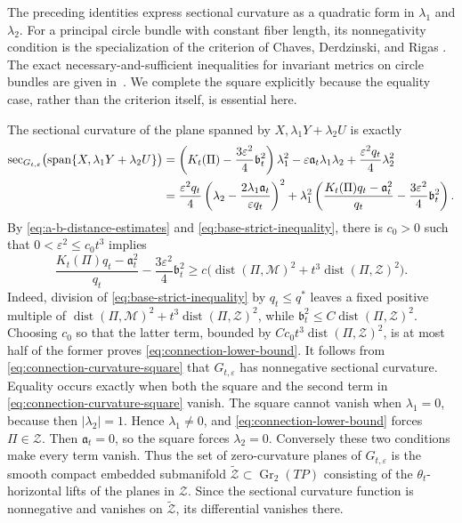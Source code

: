 \documentclass[11pt]{article}
\theoremstyle{definition}
\theoremstyle{remark}
\newcommand{\cM}{\mathcal M}
\newcommand{\cZ}{\mathcal Z}
\newcommand{\tZ}{\widetilde{\mathcal Z}}
\newcommand{\Gr}{\operatorname{Gr}}
\newcommand{\Span}{\operatorname{span}}
\newcommand{\dist}{\operatorname{dist}}
\newcommand{\eps}{\varepsilon}
\begin{document}
The preceding identities express sectional curvature as a quadratic form in
$\lambda_1$ and $\lambda_2$.  For a principal circle bundle with constant
fiber length, its nonnegativity condition is the specialization of the
criterion of Chaves, Derdzinski, and Rigas
\cite[main theorem, condition~(ii)]{ChavesDerdzinskiRigas1992}.  The exact
necessary-and-sufficient inequalities for invariant metrics on circle bundles are
given in~\cite[Lemma~3.2]{ShankarTappTuschmann2005}.  We complete the square
explicitly because the equality case, rather than the criterion itself, is
essential here.

The sectional curvature of the plane spanned by
$X,\lambda_1Y+\lambda_2U$ is exactly
\begin{align}
 \sec_{G_{t,\eps}}\bigl(\Span\{X,\lambda_1Y+\lambda_2U\}\bigr)
 &=\left(K_t(\Pi)-\frac{3\eps^2}{4}\mathfrak b_t^2\right)\lambda_1^2
   -\eps\mathfrak a_t\lambda_1\lambda_2+\frac{\eps^2q_t}{4}\lambda_2^2 \notag\\
 &=\frac{\eps^2q_t}{4}\left(\lambda_2-\frac{2\lambda_1\mathfrak a_t}{\eps q_t}\right)^2
   +\lambda_1^2\left(\frac{K_t(\Pi)q_t-\mathfrak a_t^2}{q_t}
   -\frac{3\eps^2}{4}\mathfrak b_t^2\right).                       \label{eq:connection-curvature-square}
\end{align}
By \eqref{eq:a-b-distance-estimates} and
\eqref{eq:base-strict-inequality}, there is $c_0>0$ such that
$0<\eps^2\leq c_0t^3$ implies
\begin{equation}                                                                    \label{eq:connection-lower-bound}
 \frac{K_t(\Pi)q_t-\mathfrak a_t^2}{q_t}
 -\frac{3\eps^2}{4}\mathfrak b_t^2
 \geq c\bigl(\dist(\Pi,\cM)^2+t^3\dist(\Pi,\cZ)^2\bigr).
\end{equation}
Indeed, division of \eqref{eq:base-strict-inequality} by $q_t\leq q^*$ leaves
a fixed positive multiple of
$\dist(\Pi,\cM)^2+t^3\dist(\Pi,\cZ)^2$, while
$\mathfrak b_t^2\leq C\dist(\Pi,\cZ)^2$.  Choosing $c_0$ so that the latter
term, bounded by $C c_0t^3\dist(\Pi,\cZ)^2$, is at most half of the former proves
\eqref{eq:connection-lower-bound}.
It follows from \eqref{eq:connection-curvature-square} that
$G_{t,\eps}$ has nonnegative sectional curvature.  Equality occurs exactly
when both the square and the second term in
\eqref{eq:connection-curvature-square} vanish.  The square cannot vanish when
$\lambda_1=0$, because then $|\lambda_2|=1$.  Hence $\lambda_1\neq0$, and
\eqref{eq:connection-lower-bound} forces $\Pi\in\cZ$.  Then
$\mathfrak a_t=0$, so the square forces $\lambda_2=0$.  Conversely these two
conditions make every term vanish.  Thus the set of zero-curvature planes of
$G_{t,\eps}$ is the smooth compact embedded submanifold
$\tZ\subset\Gr_2(TP)$ consisting of the $\theta_t$-horizontal lifts of the
planes in $\cZ$.  Since the sectional curvature function is nonnegative and
vanishes on $\tZ$, its differential vanishes there.
\end{document}
